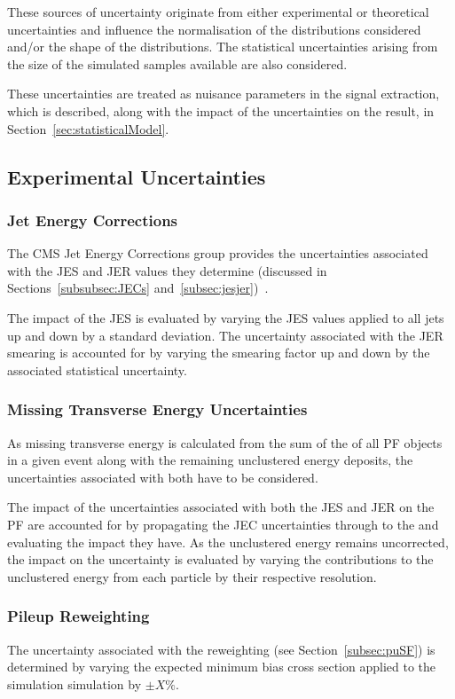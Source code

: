 These sources of uncertainty originate from either experimental or theoretical uncertainties and influence the normalisation of the distributions considered and/or the shape of the distributions.
The statistical uncertainties arising from the size of the simulated samples available are also considered.

These uncertainties are treated as nuisance parameters in the signal extraction, which is described, along with the impact of the uncertainties on the result, in Section~\ref{sec:statisticalModel}.

\subsection{Experimental Uncertainties}
\subsubsection*{Jet Energy Corrections}
The CMS Jet Energy Corrections group provides the uncertainties associated with the JES and JER values they determine (discussed in Sections~\ref{subsubsec:JECs} and~\ref{subsec:jesjer})~\cite{Khachatryan:2016kdb}. 

The impact of the JES is evaluated by varying the JES values applied to all jets up and down by a standard deviation.
The uncertainty associated with the JER smearing is accounted for by varying the smearing factor up and down by the associated statistical uncertainty.

\subsubsection*{Missing Transverse Energy Uncertainties}
As missing transverse energy is calculated from the sum of the \pT of all PF objects in a given event along with the remaining unclustered energy deposits, the uncertainties associated with both have to be considered.

The impact of the uncertainties associated with both the JES and JER on the PF \MET are accounted for by propagating the JEC uncertainties through to the \MET and evaluating the impact they have.
As the unclustered energy remains uncorrected, the impact on the \MET uncertainty is evaluated by varying the contributions to the unclustered energy from each particle by their respective resolution.

\subsubsection*{Pileup Reweighting}
The uncertainty associated with the \PU reweighting (see Section~\ref{subsec:puSF}) is determined by varying the expected minimum bias cross section applied to the simulation simulation by $\pm X\%$.

